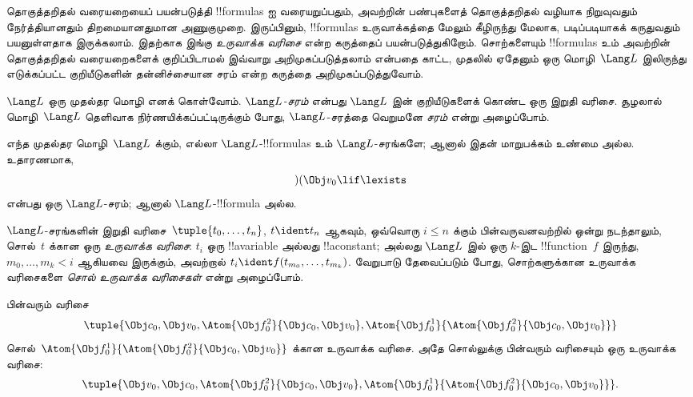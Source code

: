 \documentclass[../../../include/open-logic-section]{subfiles}
\begin{document}


தொகுத்தறிதல் வரையறையைப் பயன்படுத்தி !!{formula}s ஐ வரையறுப்பதும்,
அவற்றின் பண்புகளைத் தொகுத்தறிதல் வழியாக நிறுவுவதும் நேர்த்தியானதும்
திறமையானதுமான அணுகுமுறை. இருப்பினும், !!{formula}s உருவாக்கத்தை மேலும்
கீழிருந்து மேலாக, படிப்படியாகக் கருதுவதும் பயனுள்ளதாக இருக்கலாம். இதற்காக
இங்கு \emph{உருவாக்க வரிசை} என்ற கருத்தைப் பயன்படுத்துகிறோம்.
%
சொற்களையும் !!{formula}s உம் அவற்றின் தொகுத்தறிதல் வரையறைகளைக் குறிப்பிடாமல்
இவ்வாறு அறிமுகப்படுத்தலாம் என்பதை காட்ட, முதலில் ஏதேனும் ஒரு மொழி~$\Lang L$
இலிருந்து எடுக்கப்பட்ட குறியீடுகளின் தன்னிச்சையான சரம் என்ற கருத்தை
அறிமுகப்படுத்துவோம்.

\begin{defn}[சரங்கள்]
$\Lang L$ ஒரு முதல்தர மொழி எனக் கொள்வோம். \emph{$\Lang
L$-சரம்} என்பது $\Lang L$ இன் குறியீடுகளைக் கொண்ட ஒரு இறுதி வரிசை.
சூழலால் மொழி~$\Lang L$ தெளிவாக நிர்ணயிக்கப்பட்டிருக்கும் போது,
$\Lang L$-சரத்தை வெறுமனே \emph{சரம்} என்று அழைப்போம்.
\end{defn}

\begin{ex}
எந்த முதல்தர மொழி~$\Lang L$ க்கும், எல்லா
$\Lang L$-!!{formula}s உம் $\Lang L$-சரங்களே; ஆனால் இதன் மாறுபக்கம்
உண்மை அல்ல. உதாரணமாக, \[)(\Obj v_0\lif\lexists\] என்பது ஒரு
$\Lang L$-சரம்; ஆனால் $\Lang L$-!!{formula} அல்ல.
\end{ex}

\begin{defn}[பதங்களுக்கான உருவாக்க வரிசைகள்]
$\Lang L$-சரங்களின் இறுதி வரிசை~$\tuple{t_0,\dotsc,t_n}$,
$t \ident t_n$ ஆகவும், ஒவ்வொரு $i \leq n$ க்கும் பின்வருவனவற்றில் ஒன்று
நடந்தாலும், சொல்~$t$ க்கான ஒரு \emph{உருவாக்க வரிசை}:
$t_i$ ஒரு !!a{variable} அல்லது !!a{constant}; அல்லது $\Lang L$ இல் ஒரு
$k$-இட !!{function}~$f$ இருந்து, $m_0,\dotsc,m_k < i$ ஆகியவை இருக்கும்,
அவற்றால் $t_i \ident f(t_{m_0},\dotsc,t_{m_k})$.
வேறுபாடு தேவைப்படும் போது, சொற்களுக்கான உருவாக்க வரிசைகளை
\emph{சொல் உருவாக்க வரிசைகள்} என்று அழைப்போம்.
\end{defn}

\begin{ex}
பின்வரும் வரிசை
\[
    \tuple{\Obj c_0, \Obj v_0, \Atom{\Obj f^2_0}{\Obj c_0, \Obj v_0}, \Atom{\Obj f^1_0}{\Atom{\Obj f^2_0}{\Obj c_0, \Obj v_0}}}
\]
சொல்~$\Atom{\Obj f^1_0}{\Atom{\Obj f^2_0}{\Obj c_0, \Obj v_0}}$ க்கான
உருவாக்க வரிசை. அதே சொல்லுக்கு பின்வரும் வரிசையும் ஒரு உருவாக்க வரிசை:
\[
    \tuple{\Obj v_0, \Obj c_0, \Atom{\Obj f^2_0}{\Obj c_0, \Obj v_0}, \Atom{\Obj f^1_0}{\Atom{\Obj f^2_0}{\Obj c_0, \Obj v_0}}}.
\]
\end{ex}
\end{document}
